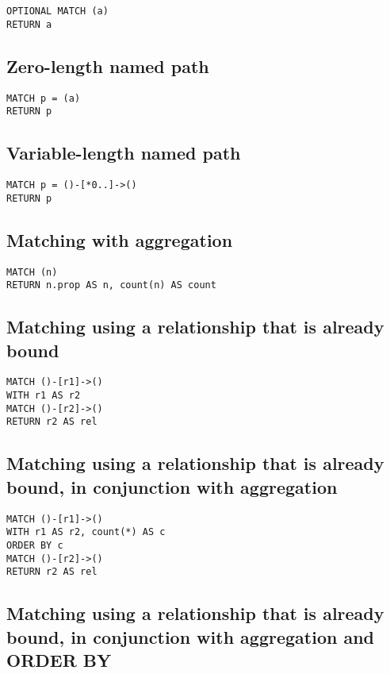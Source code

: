 \begin{lstlisting}
OPTIONAL MATCH (a)
RETURN a
\end{lstlisting}

\subsection{Zero-length named path}

\begin{lstlisting}
MATCH p = (a)
RETURN p
\end{lstlisting}

\subsection{Variable-length named path}

\begin{lstlisting}
MATCH p = ()-[*0..]->()
RETURN p
\end{lstlisting}

\subsection{Matching with aggregation}

\begin{lstlisting}
MATCH (n)
RETURN n.prop AS n, count(n) AS count
\end{lstlisting}

\subsection{Matching using a relationship that is already bound}

\begin{lstlisting}
MATCH ()-[r1]->()
WITH r1 AS r2
MATCH ()-[r2]->()
RETURN r2 AS rel
\end{lstlisting}

\subsection{Matching using a relationship that is already bound, in conjunction with aggregation}

\begin{lstlisting}
MATCH ()-[r1]->()
WITH r1 AS r2, count(*) AS c
ORDER BY c
MATCH ()-[r2]->()
RETURN r2 AS rel
\end{lstlisting}

\subsection{Matching using a relationship that is already bound, in conjunction with aggregation and ORDER BY}


